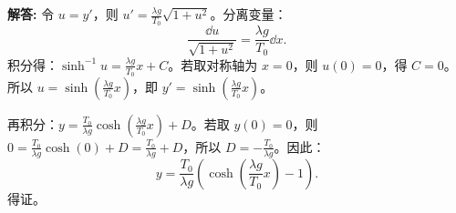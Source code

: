 \documentclass[12pt, a4paper, oneside]{ctexart}
\newenvironment{solution}{\par\noindent\textbf{解答:}\quad}{\par}
\begin{document}
\begin{solution}
    令 \(u = y'\)，则 \(u' = \frac{\lambda g}{T_0} \sqrt{1+u^2}\)。分离变量：
    \[
    \frac{\dd u}{\sqrt{1+u^2}} = \frac{\lambda g}{T_0} \dd x.
    \]
    积分得：\(\sinh^{-1} u = \frac{\lambda g}{T_0} x + C\)。若取对称轴为 \(x=0\)，则 \(u(0)=0\)，得 \(C=0\)。所以 \(u = \sinh\left( \frac{\lambda g}{T_0} x \right)\)，即 \(y' = \sinh\left( \frac{\lambda g}{T_0} x \right)\)。
    
    再积分：\(y = \frac{T_0}{\lambda g} \cosh\left( \frac{\lambda g}{T_0} x \right) + D\)。若取 \(y(0)=0\)，则 \(0 = \frac{T_0}{\lambda g} \cosh(0) + D = \frac{T_0}{\lambda g} + D\)，所以 \(D = -\frac{T_0}{\lambda g}\)。因此：
    \[
    y = \frac{T_0}{\lambda g} \left( \cosh\left( \frac{\lambda g}{T_0} x \right) - 1 \right).
    \]
    得证。
\end{solution}
\end{document}
